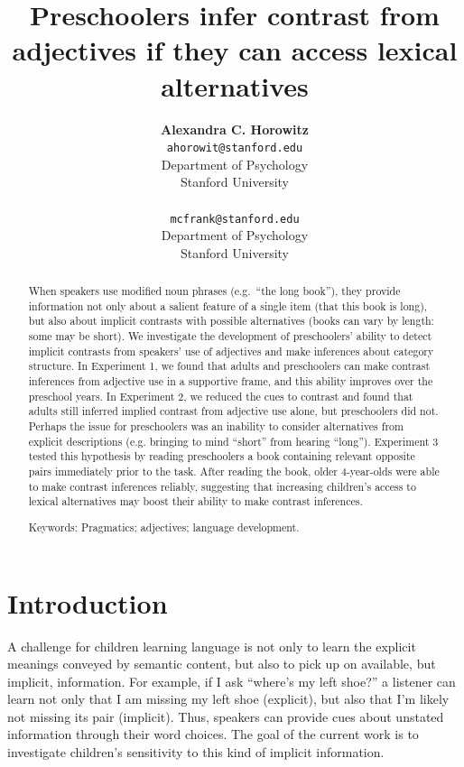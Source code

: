 \documentclass[10pt,letterpaper]{article}
\title{Preschoolers infer contrast from adjectives if they can access lexical alternatives}
\author{{\large \bf Alexandra C. Horowitz} \\ \texttt{ahorowit@stanford.edu}\\ Department of Psychology \\ Stanford University \\ 
\And {\large \bf Michael C. Frank} \\ \texttt{mcfrank@stanford.edu} \\ Department of Psychology \\ Stanford University \\ }
\begin{document}
\maketitle

\begin{abstract} 

When speakers use modified noun phrases (e.g.\ ``the long book''), they provide information not only about a salient feature of a single item (that this book is long), but also about implicit contrasts with possible alternatives (books can vary by length: some may be short).  We investigate the development of preschoolers' ability to detect implicit contrasts from speakers' use of adjectives and make inferences about category structure.  In Experiment 1, we found that adults and preschoolers can make contrast inferences from adjective use in a supportive frame, and this ability improves over the preschool years.  In Experiment 2, we reduced the cues to contrast and found that adults still inferred implied contrast from adjective use alone, but preschoolers did not.  Perhaps the issue for preschoolers was an inability to consider alternatives from  explicit descriptions (e.g. bringing to mind ``short'' from hearing ``long'').  
Experiment 3 tested this hypothesis by reading preschoolers a book containing relevant opposite pairs immediately prior to the task.  After reading the book, older 4-year-olds were able to make contrast inferences reliably, suggesting that increasing children's access to lexical alternatives may boost their ability to make contrast inferences.

{Keywords:} Pragmatics; adjectives; language development. 
\end{abstract}

\section{Introduction}

A challenge for children learning language is not only to learn the explicit meanings conveyed by semantic content, but also to pick up on available, but implicit, information.  For example, if I ask ``where's my left shoe?'' a listener can learn not only that I am missing my left shoe (explicit), but also that I'm likely not missing its pair (implicit).  Thus, speakers can provide cues about unstated information through their word choices.  The goal of the current work is to investigate children's sensitivity to this kind of implicit information. 
\end{document}
